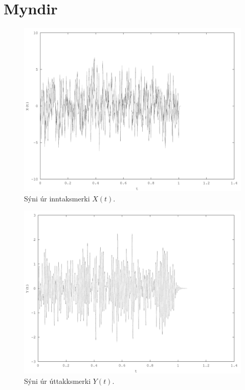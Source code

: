 \documentclass[11pt,a4paper]{article}
\begin{document}
\section{Myndir}
\begin{figure}[htbp]
    \begin{center}
        \includegraphics[scale=0.5]{fig1.pdf}
    \end{center}
    \caption{Sýni úr inntaksmerki $X(t)$.}
    \label{fig:X}
\end{figure}
\begin{figure}[htbp]
    \begin{center}
        \includegraphics[scale=0.5]{fig2.pdf}
    \end{center}
    \caption{Sýni úr úttakksmerki $Y(t)$.}
    \label{fig:Y}
\end{figure}
\end{document}
